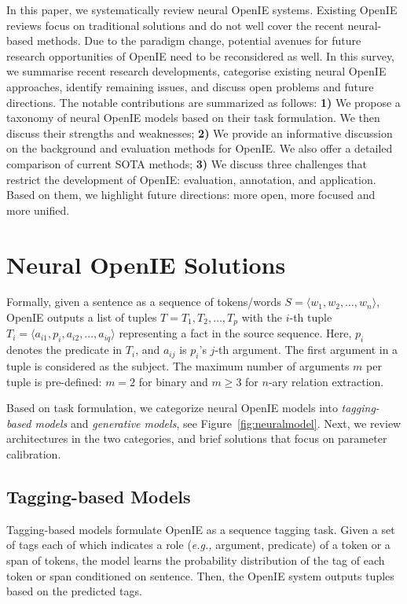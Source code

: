 \documentclass{article}
\newcommand{\eg}{\emph{e.g.,}\xspace}
\begin{document}
In this paper, we systematically review neural OpenIE systems.
Existing OpenIE reviews \cite{niklaus-etal-2018-survey,glauber2018systematic,claro2019multilingual} focus on traditional solutions and do not well cover the recent neural-based methods. 
Due to the paradigm change, potential avenues for future research opportunities of OpenIE need to be reconsidered as well.
In this survey, we summarise recent research developments, categorise existing neural OpenIE approaches, identify remaining issues, and discuss open problems and future directions.
The notable contributions are summarized as follows:
\textbf{1)} We propose a taxonomy of neural OpenIE models based on their task formulation. We then discuss their strengths and weaknesses;
\textbf{2)} We provide an informative discussion on the background and evaluation methods for OpenIE. We also  offer a detailed comparison of current SOTA methods; 
\textbf{3)} We discuss three challenges that restrict the development of OpenIE: evaluation, annotation, and application.  Based on them, we highlight future  directions: more open, more focused and more unified.

\section{Neural OpenIE Solutions}
\label{sec:methods}
Formally, given a sentence as a sequence of tokens/words \(S = \langle w_1, w_2, \ldots, w_n \rangle\), OpenIE outputs a list of tuples \(T={T_1, T_2, \ldots, T_p}\) with the \(i\)-th tuple \(T_i = \langle a_{i1}, p_i, a_{i2}, ..., a_{iq}\rangle \) representing a fact in the source sequence. 
Here, \(p_i\) denotes the predicate in \(T_i\), and \(a_{ij}\) is \(p_i\)'s \(j\)-th argument. The first argument in a tuple is considered as the subject. The maximum number of arguments \(m\) per tuple is pre-defined:  $m=2$ for binary and \(m \ge 3\) for $n$-ary relation extraction.

Based on task formulation, we categorize neural OpenIE models into \textit{tagging-based models} and \textit{generative models}, see Figure~\ref{fig:neuralmodel}. Next, we review architectures in the two categories, and brief solutions that focus on parameter calibration.

\subsection{Tagging-based Models}
Tagging-based models formulate OpenIE as a sequence tagging task. Given a set of tags each of which indicates a role (\eg argument, predicate) of a token or a span of tokens, the model learns the probability distribution of the tag of each token or span conditioned on sentence. Then, the OpenIE system outputs tuples based on the predicted tags.
\end{document}
